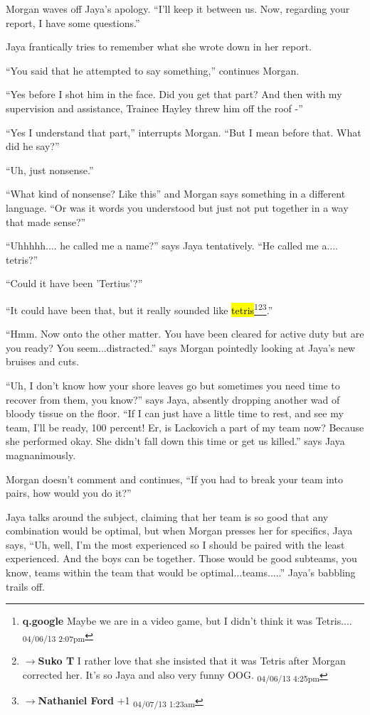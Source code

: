 Morgan waves off Jaya's apology. ``I'll keep it between us.  Now, regarding your report, I have some questions.''

Jaya frantically tries to remember what she wrote down in her report.

``You said that he attempted to say something,'' continues Morgan.

``Yes before I shot him in the face.  Did you get that part?  And then with my supervision and assistance, Trainee Hayley threw him off the roof -''

``Yes I understand that part,'' interrupts Morgan.  ``But I mean before that.  What did he say?''

``Uh, just nonsense.''

``What kind of nonsense?  Like this'' and Morgan says something in a different language. ``Or was it words you understood but just not put together in a way that made sense?''

``Uhhhhh.... he called me a name?'' says Jaya tentatively.  ``He called me a.... tetris?''

``Could it have been 'Tertius'?''

``It could have been that, but it really sounded like \hl{tetris}\footnote{\textbf{q.google }Maybe we are in a video game, but I didn't think it was Tetris.... \textsubscript{04/06/13 2:07pm}}\footnote{$\rightarrow$\textbf{Suko T }I rather love that she insisted that it was Tetris after Morgan corrected her.  It's so Jaya and also very funny OOG. \textsubscript{04/06/13 4:25pm}}\footnote{$\rightarrow$\textbf{Nathaniel Ford }+1 \textsubscript{04/07/13 1:23am}}.''

``Hmm.  Now onto the other matter.  You have been cleared for active duty but are you ready?  You seem...distracted.'' says Morgan pointedly looking at Jaya's new bruises and cuts.

``Uh, I don't know how your shore leaves go but sometimes you need time to recover from them, you know?'' says Jaya, absently dropping another wad of bloody tissue on the floor.  ``If I can just have a little time to rest, and see my team, I'll be ready, 100 percent!  Er, is Lackovich a part of my team now?  Because she performed okay.  She didn't fall down this time or get us killed.'' says Jaya magnanimously.

Morgan doesn't comment and continues, ``If you had to break your team into pairs, how would you do it?''

Jaya talks around the subject, claiming that her team is so good that any combination would be optimal, but when Morgan presses her for specifics, Jaya says, ``Uh, well, I'm the most experienced so I should be paired with the least experienced.  And the boys can be together.  Those would be good subteams, you know, teams within the team that would be optimal...teams.....''  Jaya's babbling trails off.

